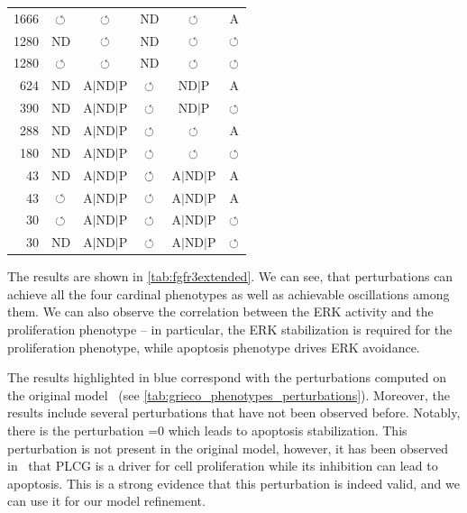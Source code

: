 \begin{table}[htb!]
\begin{tabular}{r|ccccc}
  1666  & $\circlearrowleft$ & $\circlearrowleft$         & ND       & $\circlearrowleft$      & A                \\
  1280  & ND       & $\circlearrowleft$         & ND       & $\circlearrowleft$      & $\circlearrowleft$         \\
  1280  & $\circlearrowleft$ & $\circlearrowleft$         & ND       & $\circlearrowleft$      & $\circlearrowleft$         \\
  624   & ND       & A$\mid$ND$\mid$P & $\circlearrowleft$ & ND$\mid$P     & A                \\
  390   & ND       & A$\mid$ND$\mid$P & $\circlearrowleft$ & ND$\mid$P     & $\circlearrowleft$         \\
  288   & ND       & A$\mid$ND$\mid$P & $\circlearrowleft$ & $\circlearrowleft$      & A                \\
  180   & ND       & A$\mid$ND$\mid$P & $\circlearrowleft$ & $\circlearrowleft$      & $\circlearrowleft$         \\
  43    & ND       & A$\mid$ND$\mid$P & $\circlearrowleft$ & A$\mid$ND$\mid$P & A            \\
  43    & $\circlearrowleft$ & A$\mid$ND$\mid$P & $\circlearrowleft$ & A$\mid$ND$\mid$P & A            \\
  30    & $\circlearrowleft$ & A$\mid$ND$\mid$P & $\circlearrowleft$ & A$\mid$ND$\mid$P & $\circlearrowleft$     \\
  30    & ND       & A$\mid$ND$\mid$P & $\circlearrowleft$ & A$\mid$ND$\mid$P & $\circlearrowleft$     \\
  \end{tabular}
  \label{tab:fgfr3extended_phenotypes}
  \end{table}

The results are shown in \autoref{tab:fgfr3extended}. We can see, that perturbations can achieve all the four cardinal phenotypes as well as achievable oscillations among them. We can also observe the correlation between the ERK activity and the proliferation phenotype -- in particular, the ERK stabilization is required for the proliferation phenotype, while apoptosis phenotype drives ERK avoidance.

The results highlighted in blue correspond with the perturbations computed on the original model~\cite{Grieco2013} (see \autoref{tab:grieco_phenotypes_perturbations}). Moreover, the results include several perturbations that have not been observed before. Notably, there is the perturbation =0 which leads to apoptosis stabilization. This perturbation is not present in the original model, however, it has been observed in~\cite{Vaque2014,Stanislaus2012} that PLCG is a driver for cell proliferation while its inhibition can lead to apoptosis. This is a strong evidence that this perturbation is indeed valid, and we can use it for our model refinement.

